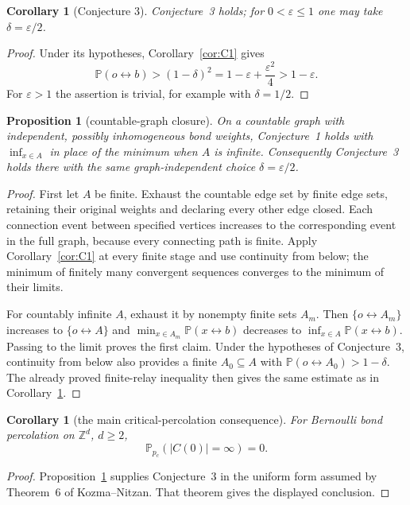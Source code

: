 \documentclass[11pt]{article}
\newtheorem{proposition}[theorem]{Proposition}
\newtheorem{corollary}[theorem]{Corollary}
\theoremstyle{definition}
\theoremstyle{remark}
\newcommand{\PP}{\mathbb P}
\newcommand{\con}{\leftrightarrow}
\begin{document}
\begin{corollary}[Conjecture 3]\label{cor:C3}
Conjecture~3 holds; for $0<\varepsilon\leq1$ one may take
$\delta=\varepsilon/2$.
\end{corollary}

\begin{proof}
Under its hypotheses, Corollary~\ref{cor:C1} gives
\[
 \PP(o\con b)>(1-\delta)^2
 =1-\varepsilon+\frac{\varepsilon^2}{4}>1-\varepsilon.
\]
For $\varepsilon>1$ the assertion is trivial, for example with
$\delta=1/2$.
\end{proof}

\begin{proposition}[countable-graph closure]\label{prop:countable}
On a countable graph with independent, possibly inhomogeneous bond
weights, Conjecture~1 holds with $\inf_{x\in A}$ in place of the minimum
when $A$ is infinite.  Consequently Conjecture~3 holds there with the
same graph-independent choice $\delta=\varepsilon/2$.
\end{proposition}

\begin{proof}
First let $A$ be finite.  Exhaust the countable edge set by finite edge
sets, retaining their original weights and declaring every other edge
closed.  Each connection event between specified vertices increases to
the corresponding event in the full graph, because every connecting path
is finite.  Apply Corollary~\ref{cor:C1} at every finite stage and use
continuity from below; the minimum of finitely many convergent sequences
converges to the minimum of their limits.

For countably infinite $A$, exhaust it by nonempty finite sets $A_m$.
Then $\{o\con A_m\}$ increases to $\{o\con A\}$ and
$\min_{x\in A_m}\PP(x\con b)$ decreases to
$\inf_{x\in A}\PP(x\con b)$.  Passing to the limit proves the first
claim.  Under the hypotheses of Conjecture~3, continuity from below also
provides a finite $A_0\subseteq A$ with
$\PP(o\con A_0)>1-\delta$.  The already proved finite-relay inequality
then gives the same estimate as in Corollary~\ref{cor:C3}.
\end{proof}

\begin{corollary}[the main critical-percolation consequence]
For Bernoulli bond percolation on $\mathbb Z^d$, $d\geq2$,
\[
 \PP_{p_c}(|C(0)|=\infty)=0.
\]
\end{corollary}

\begin{proof}
Proposition~\ref{prop:countable} supplies Conjecture~3 in the uniform form
assumed by Theorem~6 of Kozma--Nitzan.  That theorem gives the displayed
conclusion.
\end{proof}
\end{document}
